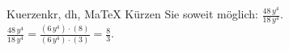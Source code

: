 \begin{MAufgabe}{Kuerzen}{kr, dh, MaTeX}
K\"urzen Sie soweit m\"oglich: $\frac{48\, y^4}{18\, y^4}$.\\ 
\ifLsg\MLoesung
\quad $\frac{48\, y^4}{18\, y^4}=\frac{(6\, y^4)\cdot(8)}{(6\, y^4)\cdot(3)}=\frac{8}{3}$.\else\relax\fi
 \end{MAufgabe}